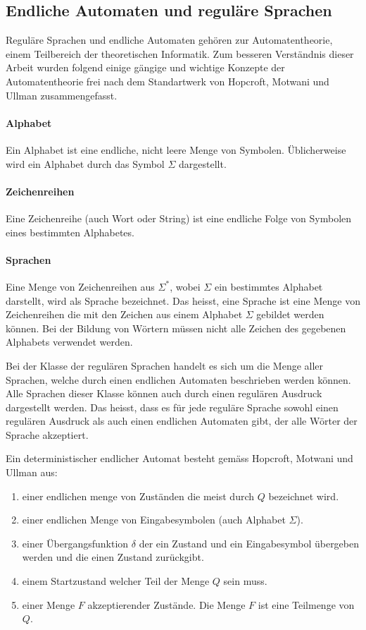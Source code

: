 \subsection{Endliche Automaten und reguläre Sprachen}
Reguläre Sprachen und endliche Automaten gehören zur Automatentheorie, einem Teilbereich der theoretischen Informatik. Zum besseren Verständnis dieser Arbeit wurden folgend einige gängige und wichtige Konzepte der Automatentheorie frei nach dem Standartwerk von Hopcroft, Motwani und Ullman zusammengefasst. \cite{hopcroft}
 
\paragraph{Alphabet}
Ein Alphabet ist eine endliche, nicht leere Menge von Symbolen. Üblicherweise wird ein Alphabet durch das Symbol $\Sigma$ dargestellt.
\paragraph{Zeichenreihen}
Eine Zeichenreihe (auch Wort oder String) ist eine endliche Folge von Symbolen eines bestimmten Alphabetes.
\paragraph{Sprachen}
Eine Menge von Zeichenreihen aus $\Sigma^*$, wobei $\Sigma$ ein bestimmtes Alphabet darstellt, wird als Sprache bezeichnet. Das heisst, eine Sprache ist eine Menge von Zeichenreihen die mit den Zeichen aus einem Alphabet $\Sigma$ gebildet werden können. Bei der Bildung von Wörtern müssen nicht alle Zeichen des gegebenen Alphabets verwendet werden.

Bei der Klasse der regulären Sprachen handelt es sich um die Menge aller Sprachen, welche durch einen endlichen Automaten beschrieben werden können. Alle Sprachen dieser Klasse können auch durch einen regulären Ausdruck dargestellt werden. Das heisst, dass es für jede reguläre Sprache sowohl einen regulären Ausdruck als auch einen endlichen Automaten gibt, der alle Wörter der Sprache akzeptiert.

Ein deterministischer endlicher Automat besteht gemäss Hopcroft, Motwani und Ullman \cite{hopcroft} aus:
\begin{enumerate}
  \item einer endlichen menge von Zuständen die meist durch $Q$ bezeichnet wird.
  \item einer endlichen Menge von Eingabesymbolen (auch Alphabet $\Sigma$).
  \item einer Übergangsfunktion $\delta$ der ein Zustand und ein Eingabesymbol übergeben werden und die einen Zustand zurückgibt.
  \item einem Startzustand welcher Teil der Menge $Q$ sein muss.
  \item einer Menge $F$ akzeptierender Zustände. Die Menge $F$ ist eine Teilmenge von $Q$.
\end{enumerate}

